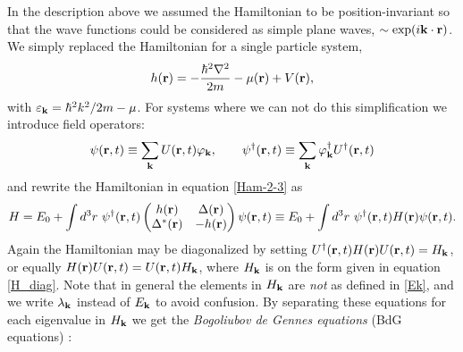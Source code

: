 \\
\\
In the description above we assumed the Hamiltonian to be position-invariant so that the wave functions could be considered as simple plane waves, $\sim \exp(i\mathbf{k}\cdot\mathbf{r}) $. We simply replaced the Hamiltonian for a single particle system, 
\begin{equation}
    h(\mathbf{r}) = -\frac{\hbar^2 \nabla^2}{2m} -\mu(\mathbf{r}) + V(\mathbf{r}),
\label{Ham-2-4}
\end{equation}
with $\varepsilon_{\mathbf{k}} = \hbar^2k^2/2m - \mu$. For systems where we can not do this simplification we introduce field operators:
\begin{equation}
    \psi(\mathbf{r},t) \equiv \sum_{\mathbf{k}}U(\mathbf{r},t)\varphi_{\mathbf{k}}, \qquad \psi^{\dagger}(\mathbf{r},t) \equiv \sum_{\mathbf{k}}\varphi_{\mathbf{k}}^{\dagger}U^{\dagger}(\mathbf{r},t) 
\end{equation}
and rewrite the Hamiltonian in equation \eqref{Ham-2-3} as
\begin{equation}
    H = E_0 + \int d^3r \ \psi^{\dagger}(\rbf,t)
    \begin{pmatrix}
        h(\rbf) & \Delta(\rbf) \\
        \Delta^*(\rbf) & -h(\rbf)
    \end{pmatrix}
    \psi(\rbf,t)
    \equiv E_0 + \int d^3r \ \psi^{\dagger}(\rbf,t) H(\rbf) \psi(\rbf,t).
\end{equation}
Again the Hamiltonian may be diagonalized by setting $U^{\dagger}(\mathbf{r},t)H(\mathbf{r})U(\mathbf{r},t) = H_{\mathbf{k}}$, or equally $H(\mathbf{r})U(\mathbf{r},t) = U(\mathbf{r},t)H_{\mathbf{k}}$, where $H_{\mathbf{k}}$ is on the form given in equation \eqref{H_diag}. Note that in general the elements in $H_{\mathbf{k}}$ are \textit{not} as defined in \eqref{Ek}, and we write $\lambda_{\mathbf{k}}$ instead of $E_{\mathbf{k}}$ to avoid confusion. By separating these equations for each eigenvalue in $H_{\mathbf{k}}$ we get the \textit{Bogoliubov de Gennes equations} (BdG equations) \cite{BdG}:
